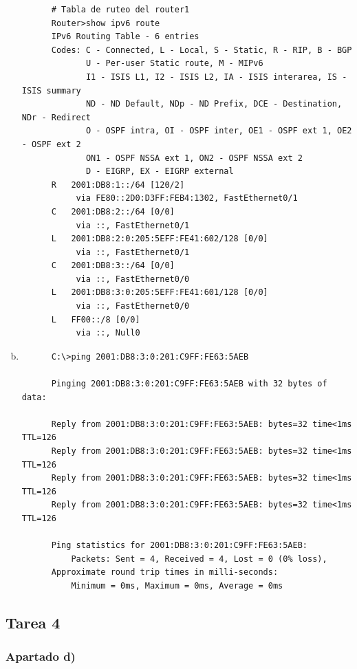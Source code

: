 \documentclass[11pt]{article}
\begin{document}
\begin{enumerate}[a)]
\begin{verbatim}
      # Tabla de ruteo del router1
      Router>show ipv6 route
      IPv6 Routing Table - 6 entries
      Codes: C - Connected, L - Local, S - Static, R - RIP, B - BGP
             U - Per-user Static route, M - MIPv6
             I1 - ISIS L1, I2 - ISIS L2, IA - ISIS interarea, IS - ISIS summary
             ND - ND Default, NDp - ND Prefix, DCE - Destination, NDr - Redirect
             O - OSPF intra, OI - OSPF inter, OE1 - OSPF ext 1, OE2 - OSPF ext 2
             ON1 - OSPF NSSA ext 1, ON2 - OSPF NSSA ext 2
             D - EIGRP, EX - EIGRP external
      R   2001:DB8:1::/64 [120/2]
           via FE80::2D0:D3FF:FEB4:1302, FastEthernet0/1
      C   2001:DB8:2::/64 [0/0]
           via ::, FastEthernet0/1
      L   2001:DB8:2:0:205:5EFF:FE41:602/128 [0/0]
           via ::, FastEthernet0/1
      C   2001:DB8:3::/64 [0/0]
           via ::, FastEthernet0/0
      L   2001:DB8:3:0:205:5EFF:FE41:601/128 [0/0]
           via ::, FastEthernet0/0
      L   FF00::/8 [0/0]
           via ::, Null0
    \end{verbatim}

    \item 
    \begin{verbatim}
      C:\>ping 2001:DB8:3:0:201:C9FF:FE63:5AEB

      Pinging 2001:DB8:3:0:201:C9FF:FE63:5AEB with 32 bytes of data:

      Reply from 2001:DB8:3:0:201:C9FF:FE63:5AEB: bytes=32 time<1ms TTL=126
      Reply from 2001:DB8:3:0:201:C9FF:FE63:5AEB: bytes=32 time<1ms TTL=126
      Reply from 2001:DB8:3:0:201:C9FF:FE63:5AEB: bytes=32 time<1ms TTL=126
      Reply from 2001:DB8:3:0:201:C9FF:FE63:5AEB: bytes=32 time<1ms TTL=126

      Ping statistics for 2001:DB8:3:0:201:C9FF:FE63:5AEB:
          Packets: Sent = 4, Received = 4, Lost = 0 (0% loss),
      Approximate round trip times in milli-seconds:
          Minimum = 0ms, Maximum = 0ms, Average = 0ms
    \end{verbatim}
  \end{enumerate}

\newpage

\subsection*{Tarea 4}

\subsubsection*{Apartado d)}
\end{document}
